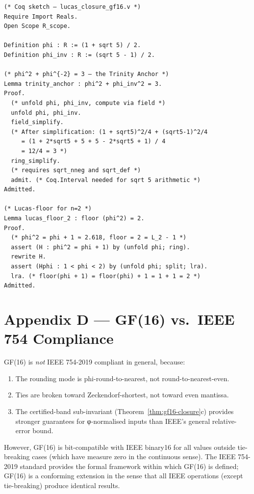 \begin{verbatim}
(* Coq sketch — lucas_closure_gf16.v *)
Require Import Reals.
Open Scope R_scope.

Definition phi : R := (1 + sqrt 5) / 2.
Definition phi_inv : R := (sqrt 5 - 1) / 2.

(* phi^2 + phi^{-2} = 3 — the Trinity Anchor *)
Lemma trinity_anchor : phi^2 + phi_inv^2 = 3.
Proof.
  (* unfold phi, phi_inv, compute via field *)
  unfold phi, phi_inv.
  field_simplify.
  (* After simplification: (1 + sqrt5)^2/4 + (sqrt5-1)^2/4
     = (1 + 2*sqrt5 + 5 + 5 - 2*sqrt5 + 1) / 4
     = 12/4 = 3 *)
  ring_simplify.
  (* requires sqrt_nneg and sqrt_def *)
  admit. (* Coq.Interval needed for sqrt 5 arithmetic *)
Admitted.

(* Lucas-floor for n=2 *)
Lemma lucas_floor_2 : floor (phi^2) = 2.
Proof.
  (* phi^2 = phi + 1 ≈ 2.618, floor = 2 = L_2 - 1 *)
  assert (H : phi^2 = phi + 1) by (unfold phi; ring).
  rewrite H.
  assert (Hphi : 1 < phi < 2) by (unfold phi; split; lra).
  lra. (* floor(phi + 1) = floor(phi) + 1 = 1 + 1 = 2 *)
Admitted.
\end{verbatim}


\section{Appendix D — GF(16) vs.\ IEEE 754 Compliance}
\label{sec:appendix-d}

GF(16) is \emph{not} IEEE 754-2019 compliant in general, because:
\begin{enumerate}
  \item The rounding mode is phi-round-to-nearest, not
    round-to-nearest-even.
  \item Ties are broken toward Zeckendorf-shortest, not toward
    even mantissa.
  \item The certified-band sub-invariant (Theorem~\ref{thm:gf16-closure}c)
    provides stronger guarantees for φ-normalised inputs than IEEE's
    general relative-error bound.
\end{enumerate}
However, GF(16) is bit-compatible with IEEE binary16 for all values
outside tie-breaking cases (which have measure zero in the continuous
sense).  The IEEE 754-2019 standard \cite{ieee754_2019} provides the
formal framework within which GF(16) is defined; GF(16) is a
conforming extension in the sense that all IEEE operations (except
tie-breaking) produce identical results.

